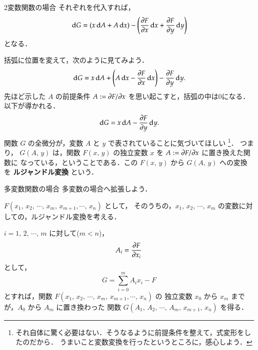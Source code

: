 \begin{mysmallsec}{2変数関数の場合}
                    それぞれを代入すれば，
                        \begin{equation*}
                            \,\mathrm{d} G = (x \,\mathrm{d} A + A \,\mathrm{d} x) - \left( \frac{\partial F}{\partial x} \,\mathrm{d} x +  \frac{\partial F}{\partial y} \,\mathrm{d} y \right)
                        \end{equation*}
                    となる．

                    括弧に位置を変えて，次のように見てみよう．
                        \begin{equation*}
                            \,\mathrm{d} G = x \,\mathrm{d} A + \left( A \,\mathrm{d} x -  \frac{\partial F}{\partial x} \,\mathrm{d} x  \right) -  \frac{\partial F}{\partial y} \,\mathrm{d} y.
                        \end{equation*}
                    先ほど示した $A$ の前提条件 $A := \partial F/\partial x$ を思い起こすと，括弧の中は0になる．
                    以下が導かれる．
                        \begin{equation*}
                            \,\mathrm{d} G = x \,\mathrm{d} A -  \frac{\partial F}{\partial y} \,\mathrm{d} y.
                        \end{equation*}
                    関数 $G$ の全微分が，変数 $A$ と $y$ で表されていることに気づいてほしい
                        \footnote{
                            それ自体に驚く必要はない．そうなるように前提条件を整えて，式変形をしたのだから．
                            うまいこと変数変換を行ったというところに，感心しよう．
                        }．
                    つまり， $G(A,\,y)$ は，関数 $F(x,\,y)$ の独立変数 $x$ を $A:=\partial F/\partial x$ に置き換えた関数に
                    なっている，ということである．この $F(x,\,y)$ から $G(A,\,y)$ への変換を \textbf{ルジャンドル変換} という．
                \end{mysmallsec}

                \begin{mysmallsec}{多変数関数の場合}
                    多変数の場合へ拡張しよう．

                    $F(x_{1},\,x_{2},\, \cdots ,\,x_{m},\,x_{m+1},\cdots,\,x_{n})$ として，
                    そのうちの，$x_{1},\,x_{2},\, \cdots ,\,x_{m}$ の変数に対しての，ルジャンドル変換を考える．

                    $i=1,\,2,\,\cdots,\,m$ に対して($m<n$)，
                        \begin{equation*}
                            A_{i} = \frac{\partial F}{\partial x_{i}}
                        \end{equation*}
                    として，
                        \begin{equation*}
                            G = \sum_{i=0}^{m} A_{i} x_{i} - F
                        \end{equation*}
                    とすれば，関数
                    $F(x_{1},\,x_{2},\, \cdots ,\,x_{m},\,x_{m+1},\cdots,\,x_{n})$ の
                    独立変数 $x_{0}$ から $x_{m}$ までが，$A_{0}$ から $A_{m}$ に置き換わった
                    関数 $G(A_{1},\,A_{2},\, \cdots ,\,A_{m},\,x_{m+1},\,x_{n})$ を得る．
                \end{mysmallsec}


